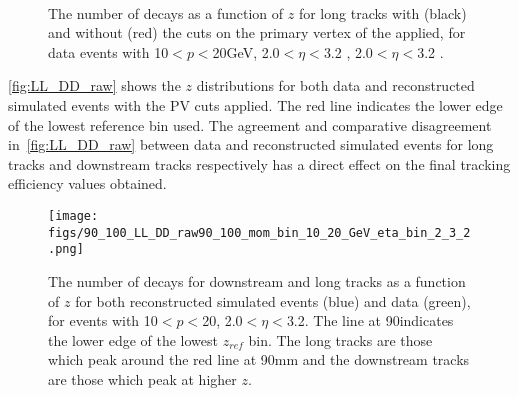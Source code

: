 \begin{figure}
\centering
  \hspace*{-1cm}
     \\
   \caption{The number of decays as a function of $z$ for long tracks with (black) and without (red) the cuts on the primary vertex of the \KS applied, for data  events with 10$<p<$20\:GeV, 2.0$<\eta<$3.2 \protect{}, 2.0$<\eta<$3.2 \protect{}.
  \label{fig:pvcut}}
\end{figure}


\autoref{fig:LL_DD_raw} shows the $z$ distributions for both data and reconstructed simulated events with the PV cuts applied. The red line indicates the lower edge of the lowest reference bin used. The agreement and comparative disagreement in~\autoref{fig:LL_DD_raw} between data and reconstructed simulated events for long tracks and downstream tracks respectively has a direct effect on the final tracking efficiency values obtained. %



\begin{figure}[h]
\centering
\texttt{[image: figs/90\_100\_LL\_DD\_raw90\_100\_mom\_bin\_10\_20\_GeV\_eta\_bin\_2\_3\_2.png]}
\caption{The number of decays for downstream and long tracks as a function of $z$ for both reconstructed simulated events (blue) and data (green), for events with 10$<p<$20\:\gevc, 2.0$<\eta<$3.2. The line at 90\mm indicates the lower edge of the lowest $z_{ref}$ bin. The long tracks are those which peak around the red line at 90\:mm and the downstream tracks are those which peak at higher $z$.}
\label{fig:LL_DD_raw}
\end{figure}







